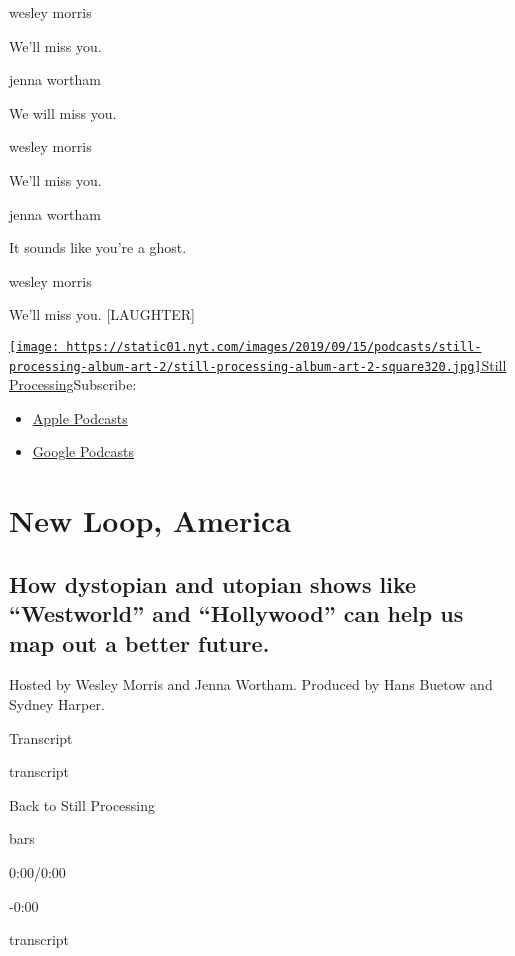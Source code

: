 wesley morris

We'll miss you.

jenna wortham

We will miss you.

wesley morris

We'll miss you.

jenna wortham

It sounds like you're a ghost.

wesley morris

We'll miss you. {[}LAUGHTER{]}

\href{https://www.nytimes.com/column/still-processing-podcast}{\texttt{[image: https://static01.nyt.com/images/2019/09/15/podcasts/still-processing-album-art-2/still-processing-album-art-2-square320.jpg]}Still
Processing}Subscribe:

\begin{itemize}
\tightlist
\item
  \href{https://itunes.apple.com/us/podcast/id1151436460}{Apple
  Podcasts}
\item
  \href{https://www.google.com/podcasts?feed=aHR0cHM6Ly9yc3MuYXJ0MTkuY29tL255dC1zdGlsbC1wcm9jZXNzaW5n}{Google
  Podcasts}
\end{itemize}

\hypertarget{new-loop-america-1}{%
\section{New Loop, America}\label{new-loop-america-1}}

\hypertarget{how-dystopian-and-utopian-shows-like-westworld-and-hollywood-can-help-us-map-out-a-better-future-1}{%
\subsection{How dystopian and utopian shows like ``Westworld'' and
``Hollywood'' can help us map out a better
future.}\label{how-dystopian-and-utopian-shows-like-westworld-and-hollywood-can-help-us-map-out-a-better-future-1}}

Hosted by Wesley Morris and Jenna Wortham. Produced by Hans Buetow and
Sydney Harper.

Transcript

transcript

Back to Still Processing

bars

0:00/0:00

-0:00

transcript

